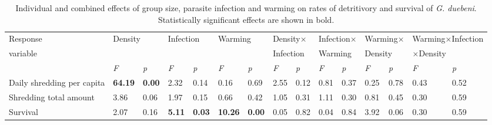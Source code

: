 \begin{landscape}
\begin{table}[]
\caption[Individual and combined effects of group size, parasite infection and warming on rates of detritivory and survival of \emph{G. duebeni}]{Individual and combined effects of group size, parasite infection and warming on rates of detritivory and survival of \emph{G. duebeni}. Statistically significant effects are shown in bold.}
\label{tab:winterstats}
\begin{tabular}{lllllllllllllll} \toprule
Response  & \multicolumn{2}{l}{Density} & \multicolumn{2}{l}{Infection} & \multicolumn{2}{l}{Warming} & \multicolumn{2}{l}{Density$\times$} & \multicolumn{2}{l}{Infection$\times$} & \multicolumn{2}{l}{Warming$\times$} & \multicolumn{2}{l}{Warming$\times$Infection} \\ 
variable & \multicolumn{2}{l}{} & \multicolumn{2}{l}{} & \multicolumn{2}{l}{} & \multicolumn{2}{l}{Infection} & \multicolumn{2}{l}{Warming} & \multicolumn{2}{l}{Density} & \multicolumn{2}{l}{$\times$Density}\\ \midrule
\textit{} & \textit{F} & \textit{p} & \textit{F} & \textit{p} & \textit{F} & \textit{p} & \textit{F} & \textit{p} & \textit{F} & \textit{p} & \textit{F} & \textit{p} & \textit{F} & \textit{p} \\
Daily shredding per capita & \textbf{64.19} & \textbf{0.00} & 2.32 & 0.14 & 0.16 & 0.69 & 2.55 & 0.12 & 0.81 & 0.37 & 0.25 & 0.78 & 0.43 & 0.52 \\
Shredding total amount & 3.86 & 0.06 & 1.97 & 0.15 & 0.66 & 0.42 & 1.05 & 0.31 & 1.11 & 0.30 & 0.81 & 0.45 & 0.30 & 0.59 \\
Survival & 2.07 & 0.16 &  \textbf{5.11} & \textbf{0.03} & \textbf{10.26} & \textbf{0.00} & 0.05 & 0.82 & 0.04 & 0.84 & 3.92 & 0.06 & 0.30 & 0.59 \\ \bottomrule
\end{tabular}
  \vspace{1cm} 


\end{table}
\end{landscape}
